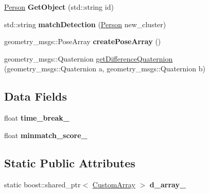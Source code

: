 \begin{DoxyCompactItemize}
\item 
\mbox{\label{classgr__detection_1_1FusionDetection_a281f36c6ce695149fd6989f311fa4310}} 
\hyperlink{structgr__detection_1_1Person}{Person} {\bfseries Get\+Object} (std\+::string id)
\item 
\mbox{\label{classgr__detection_1_1FusionDetection_a7df909766331d4c24fea079937583e9e}} 
std\+::string {\bfseries match\+Detection} (\hyperlink{structgr__detection_1_1Person}{Person} new\+\_\+cluster)
\item 
\mbox{\label{classgr__detection_1_1FusionDetection_a8a7da80a605aa5f088ee1a6b626079ad}} 
geometry\+\_\+msgs\+::\+Pose\+Array {\bfseries create\+Pose\+Array} ()
\item 
geometry\+\_\+msgs\+::\+Quaternion \hyperlink{classgr__detection_1_1FusionDetection_adf2d2812d4191bcd819233dbc5cfd6f7}{get\+Difference\+Quaternion} (geometry\+\_\+msgs\+::\+Quaternion a, geometry\+\_\+msgs\+::\+Quaternion b)
\end{DoxyCompactItemize}
\subsection*{Data Fields}
\begin{DoxyCompactItemize}
\item 
\mbox{\label{classgr__detection_1_1FusionDetection_a534d46a3505580fb180b9c884070da0e}} 
float {\bfseries time\+\_\+break\+\_\+}
\item 
\mbox{\label{classgr__detection_1_1FusionDetection_a4595ad713cf983d2df3d6b059ebef35e}} 
float {\bfseries minmatch\+\_\+score\+\_\+}
\end{DoxyCompactItemize}
\subsection*{Static Public Attributes}
\begin{DoxyCompactItemize}
\item 
\mbox{\label{classgr__detection_1_1FusionDetection_a85f715167a60aa219ddd3ad2b3220137}} 
static boost\+::shared\+\_\+ptr$<$ \hyperlink{classgr__detection_1_1CustomArray}{Custom\+Array} $>$ {\bfseries d\+\_\+array\+\_\+}
\end{DoxyCompactItemize}


